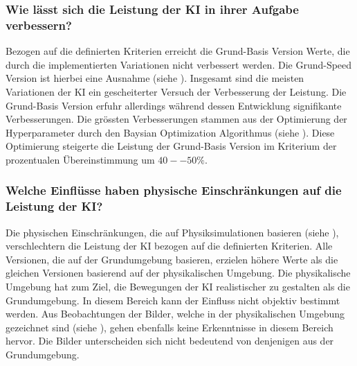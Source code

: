  
\subsubsection*{Wie lässt sich die Leistung der KI in ihrer Aufgabe verbessern?}\label{subsub:d_frage_unter_3}
Bezogen auf die definierten Kriterien erreicht die Grund-Basis Version Werte,
die durch die implementierten Variationen nicht verbessert werden. Die
Grund-Speed Version ist hierbei eine Ausnahme (siehe ).
Insgesamt sind die meisten Variationen der KI ein gescheiterter Versuch der
Verbesserung der Leistung. Die Grund-Basis Version erfuhr allerdings während
dessen Entwicklung signifikante Verbesserungen. Die grössten Verbesserungen
stammen aus der Optimierung der Hyperparameter durch den Baysian Optimization
Algorithmus (siehe ). Diese Optimierung steigerte
die Leistung der Grund-Basis Version im Kriterium der prozentualen
Übereinstimmung um $40--50\%$.
 
\subsubsection*{Welche Einflüsse haben physische Einschränkungen auf die
Leistung der KI?}\label{subsub:d_frage_unter_4} Die physischen Einschränkungen,
die auf Physiksimulationen basieren (siehe ),
verschlechtern die Leistung der KI bezogen auf die definierten Kriterien. Alle
Versionen, die auf der Grundumgebung basieren, erzielen höhere Werte als die
gleichen Versionen basierend auf der physikalischen Umgebung. Die physikalische
Umgebung hat zum Ziel, die Bewegungen der KI realistischer zu gestalten als die
Grundumgebung. In diesem Bereich kann der Einfluss nicht objektiv bestimmt
werden. Aus Beobachtungen der Bilder, welche in der physikalischen Umgebung
gezeichnet sind (siehe ), gehen ebenfalls keine
Erkenntnisse in diesem Bereich hervor. Die Bilder unterscheiden sich nicht
bedeutend von denjenigen aus der Grundumgebung.
 
